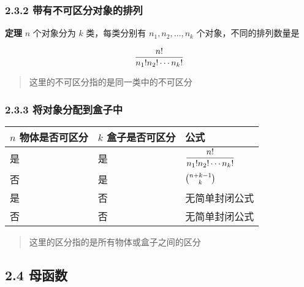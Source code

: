 \subsubsection{2.3.2
带有不可区分对象的排列}\label{ux5e26ux6709ux4e0dux53efux533aux5206ux5bf9ux8c61ux7684ux6392ux5217}

\textbf{定理} \(n\) 个对象分为 \(k\) 类，每类分别有 \(n_1,n_2,…,n_k\)
个对象，不同的排列数量是

\[
\huge \dfrac{n!}{n_1!n_2!\cdots n_k!}
\]

\begin{quote}
这里的不可区分指的是同一类中的不可区分
\end{quote}

\subsubsection{2.3.3
将对象分配到盒子中}\label{ux5c06ux5bf9ux8c61ux5206ux914dux5230ux76d2ux5b50ux4e2d}

\begin{longtable}[]{@{}
  >{\raggedright\arraybackslash}p{}
  >{\raggedright\arraybackslash}p{}
  >{\raggedright\arraybackslash}p{}@{}}
\toprule\noalign{}
\begin{minipage}[b]{\linewidth}\raggedright
\(n\) 物体是否可区分
\end{minipage} & \begin{minipage}[b]{\linewidth}\raggedright
\(k\) 盒子是否可区分
\end{minipage} & \begin{minipage}[b]{\linewidth}\raggedright
公式
\end{minipage} \\
\midrule\noalign{}
\endhead
\bottomrule\noalign{}
\endlastfoot
是 & 是 & \(\huge \dfrac{n!}{n_1!n_2!\cdots n_k!}\) \\
否 & 是 & \(\huge \binom{n+k-1}{k}\) \\
是 & 否 & 无简单封闭公式 \\
否 & 否 & 无简单封闭公式 \\
\end{longtable}

\begin{quote}
这里的区分指的是所有物体或盒子之间的区分
\end{quote}

\subsection{2.4 母函数}\label{ux6bcdux51fdux6570}

